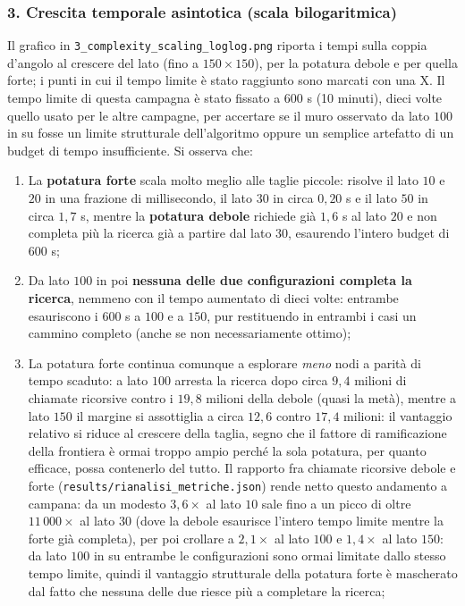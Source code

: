 \subsubsection{3. Crescita temporale asintotica (scala bilogaritmica)}
\label{sssec:scaling}
Il grafico in \texttt{3\_complexity\_scaling\_loglog.png} riporta i tempi sulla coppia d'angolo al crescere del lato (fino a $150\times150$), per la potatura debole e per quella forte; i punti in cui il tempo limite è stato raggiunto sono marcati con una X. Il tempo limite di questa campagna è stato fissato a $600$ s (10 minuti), dieci volte quello usato per le altre campagne, per accertare se il muro osservato da lato $100$ in su fosse un limite strutturale dell'algoritmo oppure un semplice artefatto di un budget di tempo insufficiente. Si osserva che:
\begin{enumerate}
    \item La \textbf{potatura forte} scala molto meglio alle taglie piccole: risolve il lato $10$ e $20$ in una frazione di millisecondo, il lato $30$ in circa $0{,}20$ s e il lato $50$ in circa $1{,}7$ s, mentre la \textbf{potatura debole} richiede già $1{,}6$ s al lato $20$ e non completa più la ricerca già a partire dal lato $30$, esaurendo l'intero budget di $600$ s;
    \item Da lato $100$ in poi \textbf{nessuna delle due configurazioni completa la ricerca}, nemmeno con il tempo aumentato di dieci volte: entrambe esauriscono i $600$ s a $100$ e a $150$, pur restituendo in entrambi i casi un cammino completo (anche se non necessariamente ottimo);
    \item La potatura forte continua comunque a esplorare \textit{meno} nodi a parità di tempo scaduto: a lato $100$ arresta la ricerca dopo circa $9{,}4$ milioni di chiamate ricorsive contro i $19{,}8$ milioni della debole (quasi la metà), mentre a lato $150$ il margine si assottiglia a circa $12{,}6$ contro $17{,}4$ milioni: il vantaggio relativo si riduce al crescere della taglia, segno che il fattore di ramificazione della frontiera è ormai troppo ampio perché la sola potatura, per quanto efficace, possa contenerlo del tutto. Il rapporto fra chiamate ricorsive debole e forte (\texttt{results/rianalisi\_metriche.json}) rende netto questo andamento a campana: da un modesto $3{,}6\times$ al lato $10$ sale fino a un picco di oltre $11\,000\times$ al lato $30$ (dove la debole esaurisce l'intero tempo limite mentre la forte già completa), per poi crollare a $2{,}1\times$ al lato $100$ e $1{,}4\times$ al lato $150$: da lato $100$ in su entrambe le configurazioni sono ormai limitate dallo stesso tempo limite, quindi il vantaggio strutturale della potatura forte è mascherato dal fatto che nessuna delle due riesce più a completare la ricerca;

\end{enumerate}
